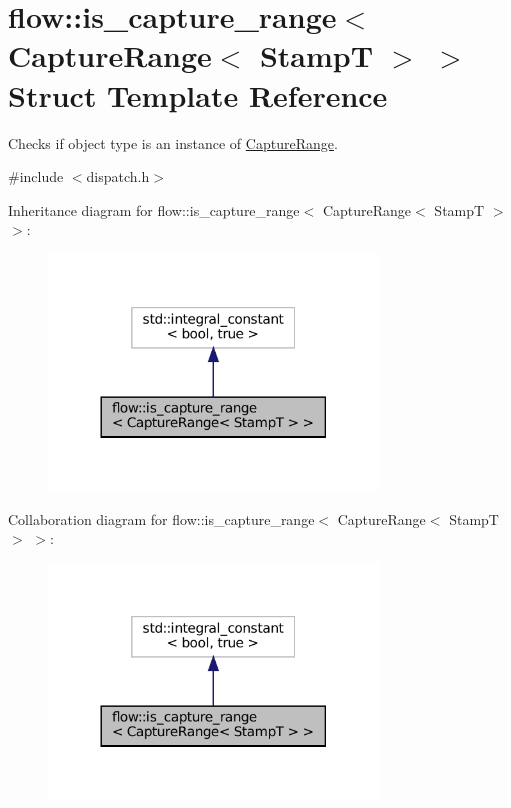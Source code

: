 \hypertarget{structflow_1_1is__capture__range_3_01_capture_range_3_01_stamp_t_01_4_01_4}{}\section{flow\+:\+:is\+\_\+capture\+\_\+range$<$ Capture\+Range$<$ StampT $>$ $>$ Struct Template Reference}
\label{structflow_1_1is__capture__range_3_01_capture_range_3_01_stamp_t_01_4_01_4}


Checks if object type is an instance of \hyperlink{structflow_1_1_capture_range}{Capture\+Range}.  




{\ttfamily \#include $<$dispatch.\+h$>$}



Inheritance diagram for flow\+:\+:is\+\_\+capture\+\_\+range$<$ Capture\+Range$<$ StampT $>$ $>$\+:\nopagebreak
\begin{figure}[H]
\begin{center}
\leavevmode
\includegraphics[width=248pt]{structflow_1_1is__capture__range_3_01_capture_range_3_01_stamp_t_01_4_01_4__inherit__graph}
\end{center}
\end{figure}


Collaboration diagram for flow\+:\+:is\+\_\+capture\+\_\+range$<$ Capture\+Range$<$ StampT $>$ $>$\+:\nopagebreak
\begin{figure}[H]
\begin{center}
\leavevmode
\includegraphics[width=248pt]{structflow_1_1is__capture__range_3_01_capture_range_3_01_stamp_t_01_4_01_4__coll__graph}
\end{center}
\end{figure}


